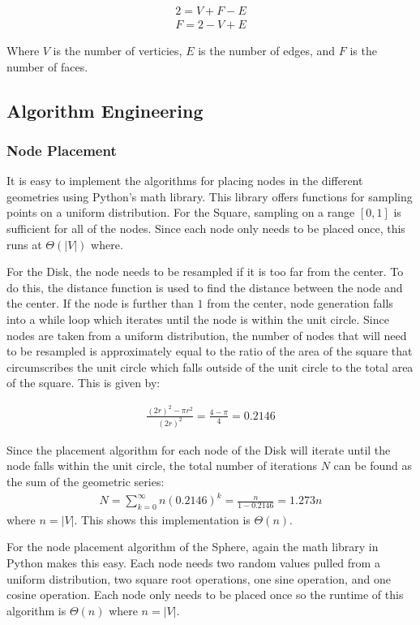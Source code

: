 \documentclass{article}
\begin{document}
        \begin{align}
            2 = V + F - E \\
            F = 2 - V + E
        \end{align}

        Where $V$ is the number of verticies, $E$ is the number of edges, and $F$ is the number of faces.

    \subsection{Algorithm Engineering}

        \subsubsection{Node Placement}
        It is easy to implement the algorithms for placing nodes in the different geometries using Python's math library. This library offers functions for sampling points on a uniform distribution. For the Square, sampling on a range $[0,1]$ is sufficient for all of the nodes. Since each node only needs to be placed once, this runs at $\Theta(|V|)$ where.
        \par
        For the Disk, the node needs to be resampled if it is too far from the center. To do this, the distance function is used to find the distance between the node and the center. If the node is further than $1$ from the center, node generation falls into a while loop which iterates until the node is within the unit circle. Since nodes are taken from a uniform distribution, the number of nodes that will need to be resampled is approximately equal to the ratio of the area of the square that circumscribes the unit circle which falls outside of the unit circle to the total area of the square. This is given by:

        \begin{align}
            \frac{(2r)^2-\pi r^2}{(2r)^2} = \frac{4-\pi}{4} = 0.2146
        \end{align}

        Since the placement algorithm for each node of the Disk will iterate until the node falls within the unit circle, the total number of iterations $N$ can be found as the sum of the geometric series:
        \begin{align}
            N = \sum_{k=0}^{\infty} n (0.2146)^k = \frac{n}{1-0.2146} = 1.273n
        \end{align}
        where $n = |V|$. This shows this implementation is $\Theta\left(n\right)$.
        \par
        For the node placement algorithm of the Sphere, again the math library in Python makes this easy. Each node needs two random values pulled from a uniform distribution, two square root operations, one sine operation, and one cosine operation. Each node only needs to be placed once so the runtime of this algorithm is $\Theta(n)$ where $n = |V|$.
\end{document}
